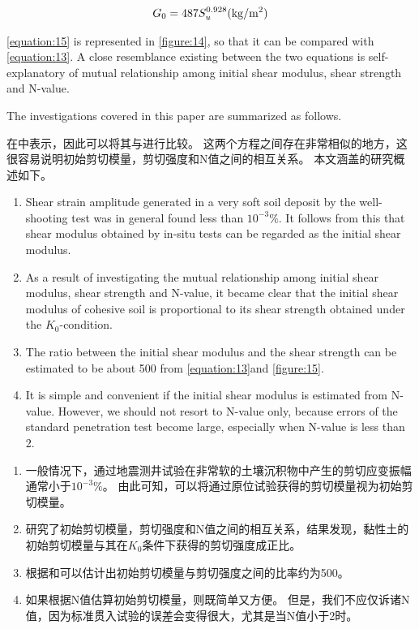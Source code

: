 \begin{align}
    G_0=487S_u^{0.928}(\rm{kg/m^2})
    \label{equation:15}
\end{align}

\begin{paracol}{2}

    \autoref{equation:15} is represented in \autoref{figure:14}, so that it can be compared with \autoref{equation:13}. A close resemblance existing between the two equations is self-explanatory of mutual relationship among initial shear modulus, shear strength and N-value.

    The investigations covered in this paper are summarized as follows.

    \switchcolumn

    在中表示，因此可以将其与进行比较。 这两个方程之间存在非常相似的地方，这很容易说明初始剪切模量，剪切强度和N值之间的相互关系。
    本文涵盖的研究概述如下。

    \switchcolumn*

    \begin{enumerate}
        \item Shear strain amplitude generated in a very soft soil deposit by the well-shooting test was in general found less than $10^{-3}\%$. It follows from this that shear modulus obtained by in-situ tests can be regarded as the initial shear modulus.
        \item As a result of investigating the mutual relationship among initial shear modulus, shear strength and N-value, it became clear that the initial shear modulus of cohesive soil is proportional to its shear strength obtained under the $K_0$-condition.
        \item The ratio between the initial shear modulus and the shear strength can be estimated to be about 500 from \autoref{equation:13}and \autoref{figure:15}.
        \item It is simple and convenient if the initial shear modulus is estimated from N-value. However, we should not resort to N-value only, because errors of the standard penetration test become large, especially when N-value is less than 2.
    \end{enumerate}
    
    \switchcolumn

    \begin{enumerate}
        \item 一般情况下，通过地震测井试验在非常软的土壤沉积物中产生的剪切应变振幅通常小于$10^{-3}\%$。 由此可知，可以将通过原位试验获得的剪切模量视为初始剪切模量。
        \item 研究了初始剪切模量，剪切强度和N值之间的相互关系，结果发现，黏性土的初始剪切模量与其在$K_0$条件下获得的剪切强度成正比。
        \item 根据和可以估计出初始剪切模量与剪切强度之间的比率约为500。
        \item 如果根据N值估算初始剪切模量，则既简单又方便。 但是，我们不应仅诉诸N值，因为标准贯入试验的误差会变得很大，尤其是当N值小于2时。
    \end{enumerate}

\end{paracol}